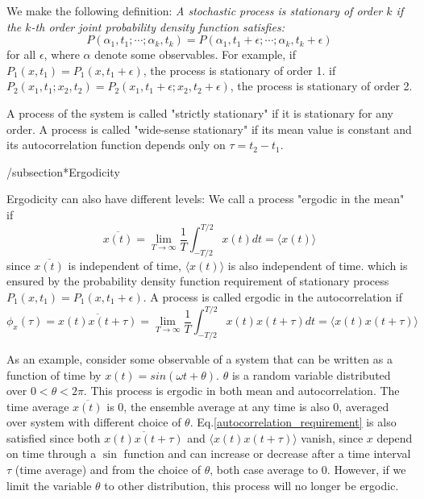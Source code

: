 \documentclass{article}
\begin{document}
We make the following definition:
\emph{A stochastic process is stationary of order $k$ if the $k$-th order 
joint probability density function satisfies:}
\begin{equation}
    P(\alpha_1,t_1; \cdots; \alpha_k, t_k) = P(\alpha_1,t_1+\epsilon; \cdots; \alpha_k, t_k+\epsilon)
\end{equation}
for all $\epsilon$, where $\alpha$ denote some observables.
For example, if $P_1(x,t_1) = P_1(x,t_1+\epsilon)$, the process is stationary of order 1.
if $P_2(x_1,t_1;x_2,t_2) = P_2(x_1,t_1+\epsilon;x_2,t_2+\epsilon)$, 
the process is stationary of order 2.

A process of the system is called "strictly stationary" if it is stationary for any order.
A process is called "wide-sense stationary" if its mean value is constant and its 
autocorrelation function depends only on $\tau = t_2 - t_1$. 

/subsection*{Ergodicity}

Ergodicity can also have different levels: We call a process "ergodic in the mean" if
\begin{equation}
    \overline{x(t)} = \lim_{T\to\infty} \frac{1}{T} \int_{-T/2}^{T/2} x(t) dt
     = \langle x(t) \rangle
\end{equation}
since $\overline{x(t)}$ is independent of time, $\langle x(t) \rangle$ is also independent of time.
which is ensured by the probability density function requirement of stationary process
$P_1(x,t_1) = P_1(x,t_1+\epsilon)$. 
A process is called ergodic in the autocorrelation if 
\begin{equation}
    \phi_x(\tau) = \overline{x(t)x(t+\tau)} 
    = \lim_{T\to\infty} \frac{1}{T} \int_{-T/2}^{T/2} x(t) x(t+\tau) dt
     = \langle x(t)x(t+\tau) \rangle \label{autocorrelation_requirement}
\end{equation}

As an example, consider some observable of a system that can be written as a 
function of time by $x(t) = sin(\omega t + \theta)$. $\theta$ is a random variable 
distributed over $0 < \theta < 2\pi$. 
This process is ergodic in both mean and autocorrelation. The time average $\overline{x(t)}$
is 0, the ensemble average at any time is also 0, averaged over system with different 
choice of $\theta$. Eq.\ref{autocorrelation_requirement} is also satisfied since both 
$\overline{x(t)x(t+\tau)}$ and $\langle x(t)x(t+\tau) \rangle$ vanish, since $x$ depend
on time through a $\sin$ function and can increase or decrease after a time interval $\tau$
(time average) and from the choice of $\theta$,
both case average to 0. 
However, if we limit the variable $\theta$ to other distribution, this process will no longer 
be ergodic.
\end{document}
